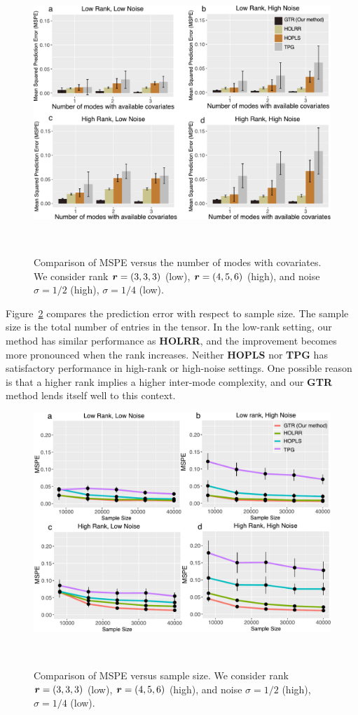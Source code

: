 \documentclass[12pt]{article}
\theoremstyle{plain}
\theoremstyle{definition}
\begin{document}
\begin{figure}[ht]
\centering
\includegraphics[width=12cm]{merge.pdf} 

\caption{Comparison of MSPE versus the number of modes with covariates. We consider rank $\bm{r}=(3,3,3)$ (low), $\bm{r}=(4,5,6)$ (high), and noise $\sigma=1/2$ (high), $\sigma=1/4$ (low).}~\label{fig:compare}

\end{figure}


Figure~\ref{fig:compare2} compares the prediction error with respect to sample size. The sample size is the total number of entries in the tensor. In the low-rank setting, our method has similar performance as {\bf HOLRR}, and the improvement becomes more pronounced when the rank increases. Neither {\bf HOPLS} nor {\bf TPG} has satisfactory performance in high-rank or high-noise settings. One possible reason is that a higher rank implies a higher inter-mode complexity, and our {\bf GTR} method lends itself well to this context. 


\begin{figure}[ht]
\centering
\includegraphics[width=12cm]{merge2.pdf} 

\caption{Comparison of MSPE versus sample size. We consider rank $\bm{r}=(3,3,3)$ (low), $\bm{r}=(4,5,6)$ (high), and noise $\sigma=1/2$ (high), $\sigma=1/4$ (low). }~\label{fig:compare2}

\end{figure}
\end{document}
